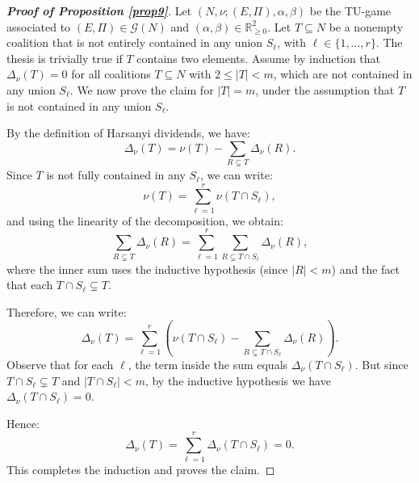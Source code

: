 \documentclass[preprint,11pt,authoryear]{elsarticle}
\theoremstyle{plain}
\begin{document}
\begin{proof}[\bf Proof of Proposition \ref{prop9}]
	Let \( (N, \nu; (E, \Pi), \alpha, \beta) \) be the TU-game associated to $(E, \Pi)\in\mathcal{G}(N)$ and $(\alpha, \beta)\in\mathbb{R}_{\geq0}^2$. Let \( T \subseteq N \) be a nonempty coalition that is not entirely contained in any union \( S_\ell \), with \( \ell \in \{1, \ldots, r\} \).
	The thesis is trivially true if \( T \) contains two elements.
	Assume by induction that \( \Delta_{\nu}(T) = 0 \) for all coalitions \( T \subseteq N \) with \( 2 \leq |T| < m \), which are not contained in any union \( S_\ell \).
	We now prove the claim for \( |T| = m \), under the assumption that \( T \) is not contained in any union \( S_\ell \).
	
	By the definition of Harsanyi dividends, we have:
	\[
	\Delta_{\nu}(T) = \nu(T) - \sum_{R \subsetneq T} \Delta_{\nu}(R).
	\]
	Since \( T \) is not fully contained in any \( S_\ell \), we can write:
	\[
	\nu(T) = \sum_{\ell=1}^{r} \nu(T \cap S_\ell),
	\]
	and using the linearity of the decomposition, we obtain:
	\[
	\sum_{R \subsetneq T} \Delta_{\nu}(R) = \sum_{\ell=1}^{r} \sum_{R \subsetneq T \cap S_\ell} \Delta_{\nu}(R),
	\]
	where the inner sum uses the inductive hypothesis (since \( |R| < m \)) and the fact that each \( T \cap S_\ell \subsetneq T \).
	
	Therefore, we can write:
	\[
	\Delta_{\nu}(T) = \sum_{\ell=1}^{r} \left( \nu(T \cap S_\ell) - \sum_{R \subsetneq T \cap S_\ell} \Delta_{\nu}(R) \right).
	\]
	Observe that for each \( \ell \), the term inside the sum equals \( \Delta_{\nu}(T \cap S_\ell) \). But since \( T \cap S_\ell \subsetneq T \) and \( |T \cap S_\ell| < m \), by the inductive hypothesis we have \( \Delta_{\nu}(T \cap S_\ell) = 0 \).
	
	Hence:
	\[
	\Delta_{\nu}(T) = \sum_{\ell=1}^{r} \Delta_{\nu}(T \cap S_\ell) = 0.
	\]
	This completes the induction and proves the claim.
\end{proof}
\end{document}
